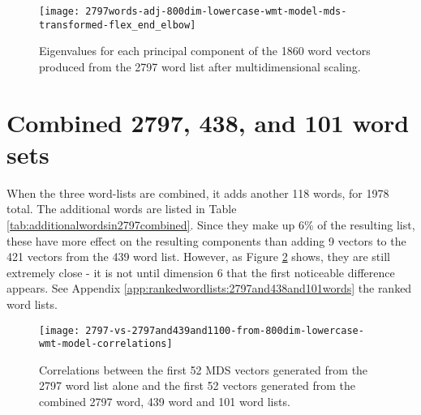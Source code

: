 \begin{figure}[tbp]
    \texttt{[image: 2797words-adj-800dim-lowercase-wmt-model-mds-transformed-flex\_end\_elbow]}
    \caption{Eigenvalues for each principal component of the 1860 word vectors
    produced from the 2797 word list after multidimensional scaling.}
    \label{fig:2797wordsmdseigenvalues}
\end{figure}


\section{Combined 2797, 438, and 101 word sets}

When the three word-lists are combined, it adds another 118 words, for 1978
total. The additional words are listed in Table 
\ref{tab:additionalwordsin2797combined}. Since they make up 6\% of the resulting
list, these have more effect on the resulting
components than adding 9 vectors to the 421 vectors from the 439 word list.
However, as Figure \ref{fig:2797vs2797and439and100} shows, they are still
extremely close - it is not until dimension 6 that the first noticeable
difference appears. See Appendix \ref{app:rankedwordlists:2797and438and101words}
the ranked word lists.


\begin{figure}[tbp]
    \texttt{[image: 2797-vs-2797and439and1100-from-800dim-lowercase-wmt-model-correlations]}
    \caption{Correlations between the first 52 MDS vectors generated from the 
    2797 word list alone and the first 52 vectors generated from the combined
    2797 word, 439 word and 101 word lists.}
    \label{fig:2797vs2797and439and100}
\end{figure}


